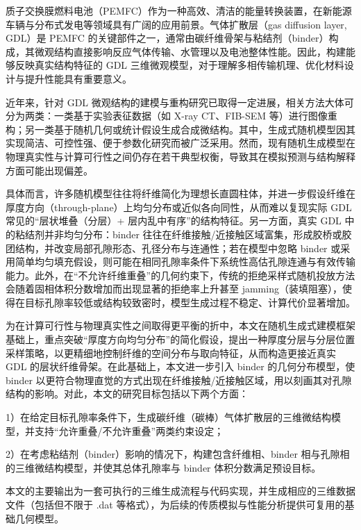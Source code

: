 

质子交换膜燃料电池（PEMFC）作为一种高效、清洁的能量转换装置，在新能源车辆与分布式发电等领域具有广阔的应用前景\cite{orilade2025review}。气体扩散层（gas diffusion layer, GDL）是 PEMFC 的关键部件之一，通常由碳纤维骨架与粘结剂（binder）构成，其微观结构直接影响反应气体传输、水管理以及电池整体性能\cite{tseng2010effects}。因此，构建能够反映真实结构特征的 GDL 三维微观模型，对于理解多相传输机理、优化材料设计与提升性能具有重要意义。

近年来，针对 GDL 微观结构的建模与重构研究已取得一定进展，相关方法大体可分为两类：一类基于实验表征数据（如 X-ray CT、FIB-SEM 等）进行图像重构\cite{尹泽泉2023基于纤维面内取向分布的气体扩散层重构与传输性能分析}；另一类基于随机几何或统计假设生成合成微结构\cite{you2024performance}。其中，生成式随机模型因其实现简洁、可控性强、便于参数化研究而被广泛采用。然而，现有随机生成模型在物理真实性与计算可行性之间仍存在若干典型权衡，导致其在模拟预测与结构解释方面可能出现偏差。

具体而言，许多随机模型往往将纤维简化为理想长直圆柱体，并进一步假设纤维在厚度方向（through-plane）上均匀分布或近似各向同性，从而难以复现实际 GDL 常见的“层状堆叠（分层）+ 层内乱中有序”的结构特征。另一方面，真实 GDL 中的粘结剂并非均匀分布：binder 往往在纤维接触/近接触区域富集，形成胶桥或胶团结构，并改变局部孔隙形态、孔径分布与连通性；若在模型中忽略 binder 或采用简单均匀填充假设，则可能在相同孔隙率条件下系统性高估孔隙连通与有效传输能力。此外，在“不允许纤维重叠”的几何约束下，传统的拒绝采样式随机投放方法会随着固相体积分数增加而出现显著的拒绝率上升甚至 jamming（装填阻塞），使得在目标孔隙率较低或结构较致密时，模型生成过程不稳定、计算代价显著增加。

为在计算可行性与物理真实性之间取得更平衡的折中，本文在随机生成式建模框架基础上，重点突破“厚度方向均匀分布”的简化假设，提出一种厚度分层与分层位置采样策略，以更精细地控制纤维的空间分布与取向特征，从而构造更接近真实 GDL 的层状纤维骨架。在此基础上，本文进一步引入 binder 的几何分布模型，使 binder 以更符合物理直觉的方式出现在纤维接触/近接触区域，用以刻画其对孔隙结构的影响。对此，本文的研究目标包括以下两个方面：

1）在给定目标孔隙率条件下，生成碳纤维（碳棒）气体扩散层的三维微结构模型，并支持“允许重叠/不允许重叠”两类约束设定；

2）在考虑粘结剂（binder）影响的情况下，构建包含纤维相、binder 相与孔隙相的三维微结构模型，并使其总体孔隙率与 binder 体积分数满足预设目标。

本文的主要输出为一套可执行的三维生成流程与代码实现，并生成相应的三维数据文件（包括但不限于 .dat 等格式），为后续的传质模拟与性能分析提供可复用的基础几何模型。

